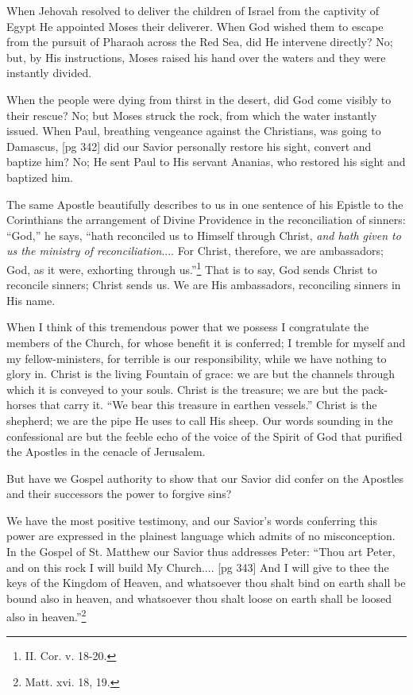 When Jehovah resolved to deliver the children
of Israel from the captivity of Egypt He appointed
Moses their deliverer. When God wished
them to escape from the pursuit of Pharaoh across
the Red Sea, did He intervene directly? No; but,
by His instructions, Moses raised his hand over
the waters and they were instantly divided.

When the people were dying from thirst in the
desert, did God come visibly to their rescue? No;
but Moses struck the rock, from which the water
instantly issued. When Paul, breathing vengeance
against the Christians, was going to Damascus,
[pg 342]
did our Savior personally restore his sight,
convert and baptize him? No; He sent Paul to
His servant Ananias, who restored his sight and
baptized him.

The same Apostle beautifully describes to us in
one sentence of his Epistle to the Corinthians the
arrangement of Divine Providence in the reconciliation
of sinners: “God,” he says, “hath reconciled
us to Himself through Christ, \emph{and hath given
to us the ministry of reconciliation}.... For
Christ, therefore, we are ambassadors; God, as it
were, exhorting through us.”\footnote{II.
Cor. v. 18-20.} That is to say,
God sends Christ to reconcile sinners; Christ
sends us. We are His ambassadors, reconciling
sinners in His name.

When I think of this tremendous power that we
possess I congratulate the members of the Church,
for whose benefit it is conferred; I tremble for myself
and my fellow-ministers, for terrible is our
responsibility, while we have nothing to glory in.
Christ is the living Fountain of grace: we are but
the channels through which it is conveyed to your
souls. Christ is the treasure; we are but the pack-horses
that carry it. “We bear this treasure in
earthen vessels.” Christ is the shepherd; we are
the pipe He uses to call His sheep. Our words
sounding in the confessional are but the feeble echo
of the voice of the Spirit of God that purified the
Apostles in the cenacle of Jerusalem.

But have we Gospel authority to show that our
Savior did confer on the Apostles and their successors
the power to forgive sins?

We have the most positive testimony, and our
Savior's words conferring this power are expressed
in the plainest language which admits of
no misconception. In the Gospel of St. Matthew
our Savior thus addresses Peter: “Thou art
Peter, and on this rock I will build My Church....
[pg 343]
And I will give to thee the keys of the Kingdom
of Heaven, and whatsoever thou shalt bind
on earth shall be bound also in heaven, and whatsoever
thou shalt loose on earth shall be loosed
also in heaven.”\footnote{Matt. xvi. 18, 19.}

